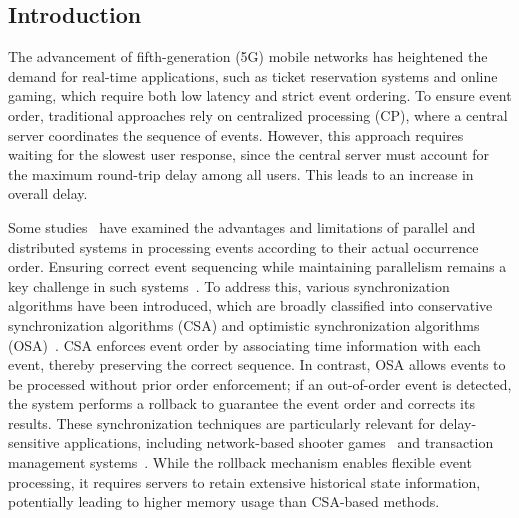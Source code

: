 \documentclass[conference]{IEEEtran}
\begin{document}
\begin{CJK}{UTF8}{ipxm}
\section{Introduction}
\label{sec:introduction}

The advancement of fifth-generation (5G) mobile networks has heightened the demand for real-time applications, such as ticket reservation systems and online gaming, which require both low latency and strict event ordering.
To ensure event order, traditional approaches rely on centralized processing (CP), where a central server coordinates the sequence of events.
However, this approach requires waiting for the slowest user response, since the central server must account for the maximum round-trip delay among all users. 
This leads to an increase in overall delay.

Some studies~\cite{OSA_Kawabata_5,OSA_Kawabata_6} have examined the advantages and limitations of parallel and distributed systems in processing events according to their actual occurrence order. 
Ensuring correct event sequencing while maintaining parallelism remains a key challenge in such systems~\cite{OSA_Kawabata_7,OSA_Kawabata_8}. 
To address this, various synchronization algorithms have been introduced, which are broadly classified into conservative synchronization algorithms (CSA) and optimistic synchronization algorithms (OSA)~\cite{OSA_Kawabata_9}. 
CSA enforces event order by associating time information with each event, thereby preserving the correct sequence. 
In contrast, OSA allows events to be processed without prior order enforcement; if an out-of-order event is detected, the system performs a rollback to guarantee the event order and corrects its results.
These synchronization techniques are particularly relevant for delay-sensitive applications, including network-based shooter games~\cite{OSA_Kawabata_10} and transaction management systems~\cite{OSA_Kawabata_11}.
While the rollback mechanism enables flexible event processing, it requires servers to retain extensive historical state information, potentially leading to higher memory usage than CSA-based methods.


\end{CJK}
\end{document}

